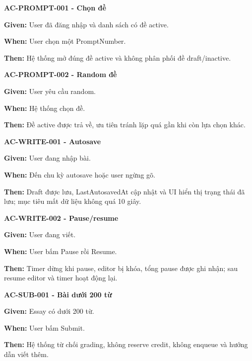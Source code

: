 \documentclass[11pt,a4paper]{article}
\begin{document}
\begin{acceptancebox}
\textbf{AC-PROMPT-001 - Chọn đề}\par
\textbf{Given:} User đã đăng nhập và danh sách có đề active.\par
\textbf{When:} User chọn một PromptNumber.\par
\textbf{Then:} Hệ thống mở đúng đề active và không phân phối đề draft/\allowbreak{}inactive.
\end{acceptancebox}

\begin{acceptancebox}
\textbf{AC-PROMPT-002 - Random đề}\par
\textbf{Given:} User yêu cầu random.\par
\textbf{When:} Hệ thống chọn đề.\par
\textbf{Then:} Đề active được trả về, ưu tiên tránh lặp quá gần khi còn lựa chọn khác.
\end{acceptancebox}

\begin{acceptancebox}
\textbf{AC-WRITE-001 - Autosave}\par
\textbf{Given:} User đang nhập bài.\par
\textbf{When:} Đến chu kỳ autosave hoặc user ngừng gõ.\par
\textbf{Then:} Draft được lưu, LastAutosavedAt cập nhật và UI hiển thị trạng thái đã lưu; mục tiêu mất dữ liệu không quá 10 giây.
\end{acceptancebox}

\begin{acceptancebox}
\textbf{AC-WRITE-002 - Pause/\allowbreak{}resume}\par
\textbf{Given:} User đang viết.\par
\textbf{When:} User bấm Pause rồi Resume.\par
\textbf{Then:} Timer dừng khi pause, editor bị khóa, tổng pause được ghi nhận; sau resume editor và timer hoạt động lại.
\end{acceptancebox}

\begin{acceptancebox}
\textbf{AC-SUB-001 - Bài dưới 200 từ}\par
\textbf{Given:} Essay có dưới 200 từ.\par
\textbf{When:} User bấm Submit.\par
\textbf{Then:} Hệ thống từ chối grading, không reserve credit, không enqueue và hướng dẫn viết thêm.
\end{acceptancebox}
\end{document}
